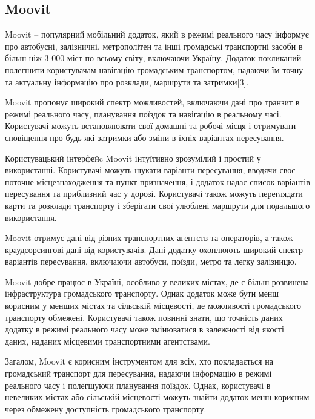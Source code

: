 \subsection{Moovit}
\label{subsec:moovit-subsection}

Moovit -- популярний мобільний додаток, який в режимі реального часу інформує про автобусні, залізничні, метрополітен та інші громадські транспортні засоби в більш ніж 3 000 міст по всьому світу, включаючи Україну. Додаток покликаний полегшити користувачам навігацію громадським транспортом, надаючи їм точну та актуальну інформацію про розклади, маршрути та затримки[3].

Moovit пропонує широкий спектр можливостей, включаючи дані про транзит в режимі реального часу, планування поїздок та навігацію в реальному часі. Користувачі можуть встановлювати свої домашні та робочі місця і отримувати сповіщення про будь-які затримки або зміни в їхніх варіантах пересування.

Користувацький інтерфейc Moovit інтуїтивно зрозумілий і простий у використанні. Користувачі можуть шукати варіанти пересування, вводячи своє поточне місцезнаходження та пункт призначення, і додаток надає список варіантів пересування та приблизний час у дорозі. Користувачі також можуть переглядати карти та розклади транспорту і зберігати свої улюблені маршрути для подальшого використання.

Moovit отримує дані від різних транспортних агентств та операторів, а також краудсорсингові дані від користувачів. Дані додатку охоплюють широкий спектр варіантів пересування, включаючи автобуси, поїзди, метро та легку залізницю.

Moovit добре працює в Україні, особливо у великих містах, де є більш розвинена інфраструктура громадського транспорту. Однак додаток може бути менш корисним у менших містах та сільській місцевості, де можливості громадського транспорту обмежені. Користувачі також повинні знати, що точність даних додатку в режимі реального часу може змінюватися в залежності від якості даних, наданих місцевими транспортними агентствами.

Загалом, Moovit є корисним інструментом для всіх, хто покладається на громадський транспорт для пересування, надаючи інформацію в режимі реального часу і полегшуючи планування поїздок. Однак, користувачі в невеликих містах або сільській місцевості можуть знайти додаток менш корисним через обмежену доступність громадського транспорту.
